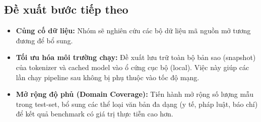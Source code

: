﻿\documentclass[12pt,a4paper]{article}
\begin{document}
\subsection{Đề xuất bước tiếp theo}
\begin{itemize}
    \item \textbf{Củng cố dữ liệu:} Nhóm sẽ nghiên cứu các bộ dữ liệu mã nguồn mở tương đương để bổ sung.
    \item \textbf{Tối ưu hóa môi trường chạy:} Đề xuất lưu trữ toàn bộ bản sao (snapshot) của tokenizer và cached model vào ổ cứng cục bộ (local). Việc này giúp các lần chạy pipeline sau không bị phụ thuộc vào tốc độ mạng.
    \item \textbf{Mở rộng độ phủ (Domain Coverage):} Tiến hành mở rộng số lượng mẫu trong test-set, bổ sung các thể loại văn bản đa dạng (y tế, pháp luật, báo chí) để kết quả benchmark có giá trị thực tiễn cao hơn.
\end{itemize}
\end{document}
